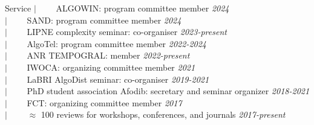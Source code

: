 \documentclass[french]{resume} %
\begin{document}
	\begin{rSection}{Service} %
		$| \qquad$ ALGOWIN: program committee member \hfill {\em 2024} \\
		$| \qquad$ SAND: program committee member \hfill {\em 2024} \\
		$| \qquad$ LIPNE complexity seminar: co-organiser \hfill {\em 2023-present}\\
		$| \qquad$ AlgoTel: program committee member \hfill {\em 2022-2024} \\
		$| \qquad$ ANR TEMPOGRAL: member \hfill {\em 2022-present} \\
		$| \qquad$ IWOCA: organizing committee member \hfill {\em 2021}\\
		$| \qquad$ LaBRI AlgoDist seminar: co-organiser \hfill {\em 2019-2021}\\
		$| \qquad$ PhD student association Afodib: secretary and seminar organizer \hfill {\em 2018-2021}\\
		$| \qquad$ FCT: organizing committee member \hfill {\em 2017}\\
		$| \qquad$ $\approx$ 100 reviews for workshops, conferences, and journals \hfill {\em 2017-present}\\
	\end{rSection}
\end{document}
